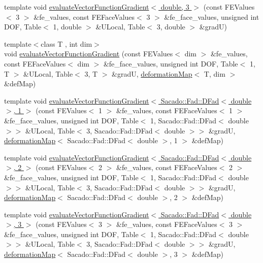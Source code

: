 \begin{DoxyCompactItemize}
\item 
template void \hyperlink{function_evaluations_8cc_aa2d12bff0463147f781bf71f070705cc}{evaluate\-Vector\-Function\-Gradient$<$ double, 3 $>$} (const F\-E\-Values$<$ 3 $>$ \&fe\-\_\-values, const F\-E\-Face\-Values$<$ 3 $>$ \&fe\-\_\-face\-\_\-values, unsigned int D\-O\-F, Table$<$ 1, double $>$ \&U\-Local, Table$<$ 3, double $>$ \&grad\-U)
\item 
{\footnotesize template$<$class T , int dim$>$ }\\void \hyperlink{group___evaluation_functions_ga9608539d601a91aff1ba01ccc720fbe0}{evaluate\-Vector\-Function\-Gradient} (const F\-E\-Values$<$ dim $>$ \&fe\-\_\-values, const F\-E\-Face\-Values$<$ dim $>$ \&fe\-\_\-face\-\_\-values, unsigned int D\-O\-F, Table$<$ 1, T $>$ \&U\-Local, Table$<$ 3, T $>$ \&grad\-U, \hyperlink{structdeformation_map}{deformation\-Map}$<$ T, dim $>$ \&def\-Map)
\item 
template void \hyperlink{function_evaluations_8cc_ae5de39f710bc6b9e6009f18de76cadbb}{evaluate\-Vector\-Function\-Gradient$<$ Sacado\-::\-Fad\-::\-D\-Fad$<$ double $>$, 1 $>$} (const F\-E\-Values$<$ 1 $>$ \&fe\-\_\-values, const F\-E\-Face\-Values$<$ 1 $>$ \&fe\-\_\-face\-\_\-values, unsigned int D\-O\-F, Table$<$ 1, Sacado\-::\-Fad\-::\-D\-Fad$<$ double $>$$>$ \&U\-Local, Table$<$ 3, Sacado\-::\-Fad\-::\-D\-Fad$<$ double $>$$>$ \&grad\-U, \hyperlink{structdeformation_map}{deformation\-Map}$<$ Sacado\-::\-Fad\-::\-D\-Fad$<$ double $>$, 1 $>$ \&def\-Map)
\item 
template void \hyperlink{function_evaluations_8cc_a27075eb9170789806dc7fb366382e29d}{evaluate\-Vector\-Function\-Gradient$<$ Sacado\-::\-Fad\-::\-D\-Fad$<$ double $>$, 2 $>$} (const F\-E\-Values$<$ 2 $>$ \&fe\-\_\-values, const F\-E\-Face\-Values$<$ 2 $>$ \&fe\-\_\-face\-\_\-values, unsigned int D\-O\-F, Table$<$ 1, Sacado\-::\-Fad\-::\-D\-Fad$<$ double $>$$>$ \&U\-Local, Table$<$ 3, Sacado\-::\-Fad\-::\-D\-Fad$<$ double $>$$>$ \&grad\-U, \hyperlink{structdeformation_map}{deformation\-Map}$<$ Sacado\-::\-Fad\-::\-D\-Fad$<$ double $>$, 2 $>$ \&def\-Map)
\item 
template void \hyperlink{function_evaluations_8cc_ab4669516f8f9436b73dedeb24cc0ffff}{evaluate\-Vector\-Function\-Gradient$<$ Sacado\-::\-Fad\-::\-D\-Fad$<$ double $>$, 3 $>$} (const F\-E\-Values$<$ 3 $>$ \&fe\-\_\-values, const F\-E\-Face\-Values$<$ 3 $>$ \&fe\-\_\-face\-\_\-values, unsigned int D\-O\-F, Table$<$ 1, Sacado\-::\-Fad\-::\-D\-Fad$<$ double $>$$>$ \&U\-Local, Table$<$ 3, Sacado\-::\-Fad\-::\-D\-Fad$<$ double $>$$>$ \&grad\-U, \hyperlink{structdeformation_map}{deformation\-Map}$<$ Sacado\-::\-Fad\-::\-D\-Fad$<$ double $>$, 3 $>$ \&def\-Map)

\end{DoxyCompactItemize}
